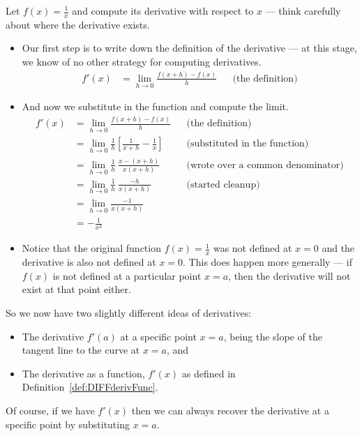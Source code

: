 \begin{eg}[The derivative of $f(x)=\tfrac{1}{x}$]\label{eg:DIFFderivXm1}
Let $f(x) = \frac{1}{x}$ and compute its derivative with respect to $x$ --- think
carefully about where the derivative exists.
\begin{itemize}
 \item Our first step is to write down the definition of the derivative --- at
this stage, we know of no other strategy for computing derivatives.
\begin{align*}
f'(x)&=\lim_{h\rightarrow 0}\frac{f(x+h)-f(x)}{h}
     && \text{(the definition)}
\end{align*}
\item And now we substitute in the function and compute the limit.
\begin{align*}
f'(x)&=\lim_{h\rightarrow 0}\frac{f(x+h)-f(x)}{h}
     && \text{(the definition)} \\
&=\lim_{h\rightarrow 0}\frac{1}{h}\left[\frac{1}{x+h}-\frac{1}{x}\right]
     && \text{(substituted in the function)} \\
&=\lim_{h\rightarrow 0}\frac{1}{h}\ \frac{x-(x+h)}{x(x+h)}
     && \text{(wrote over a common denominator)} \\
&=\lim_{h\rightarrow 0}\frac{1}{h}\ \frac{-h}{x(x+h)}
     && \text{(started cleanup)} \\
&=\lim_{h\rightarrow 0} \frac{-1}{x(x+h)} \\
&=-\frac{1}{x^2}
\end{align*}
\item Notice that the original function $f(x)=\frac{1}{x}$ was not defined at
$x=0$ and  the derivative is also not defined  at $x=0$. This does happen more
generally --- if $f(x)$ is not defined at a particular point $x=a$, then the derivative
will not exist at that point either.
\end{itemize}

\end{eg}




So we now have two slightly different ideas of derivatives:
\begin{itemize}
 \item The derivative $f'(a)$ at a specific point $x=a$, being the slope of the tangent
line to the curve at $x=a$, and
\item The derivative as a function, $f'(x)$ as defined in
Definition~\ref{def:DIFFderivFunc}.
\end{itemize}
Of course, if we have $f'(x)$ then we can always recover the derivative at a specific
point by substituting $x=a$.



